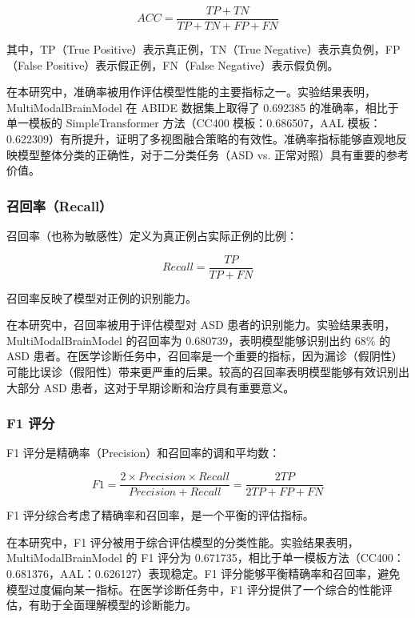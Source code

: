 \documentclass[12pt,a4paper]{article}
\begin{document}
\begin{equation}
ACC = \frac{TP + TN}{TP + TN + FP + FN}
\end{equation}

其中，TP（True Positive）表示真正例，TN（True Negative）表示真负例，FP（False Positive）表示假正例，FN（False Negative）表示假负例。

在本研究中，准确率被用作评估模型性能的主要指标之一。实验结果表明，MultiModalBrainModel 在 ABIDE 数据集上取得了 0.692385 的准确率，相比于单一模板的 SimpleTransformer 方法（CC400 模板：0.686507，AAL 模板：0.622309）有所提升，证明了多视图融合策略的有效性。准确率指标能够直观地反映模型整体分类的正确性，对于二分类任务（ASD vs. 正常对照）具有重要的参考价值。

\subsubsection{召回率（Recall）}

召回率（也称为敏感性）定义为真正例占实际正例的比例：

\begin{equation}
Recall = \frac{TP}{TP + FN}
\end{equation}

召回率反映了模型对正例的识别能力。

在本研究中，召回率被用于评估模型对 ASD 患者的识别能力。实验结果表明，MultiModalBrainModel 的召回率为 0.680739，表明模型能够识别出约 68\% 的 ASD 患者。在医学诊断任务中，召回率是一个重要的指标，因为漏诊（假阴性）可能比误诊（假阳性）带来更严重的后果。较高的召回率表明模型能够有效识别出大部分 ASD 患者，这对于早期诊断和治疗具有重要意义。

\subsubsection{F1 评分}

F1 评分是精确率（Precision）和召回率的调和平均数：

\begin{equation}
F1 = \frac{2 \times Precision \times Recall}{Precision + Recall} = \frac{2TP}{2TP + FP + FN}
\end{equation}

F1 评分综合考虑了精确率和召回率，是一个平衡的评估指标。

在本研究中，F1 评分被用于综合评估模型的分类性能。实验结果表明，MultiModalBrainModel 的 F1 评分为 0.671735，相比于单一模板方法（CC400：0.681376，AAL：0.626127）表现稳定。F1 评分能够平衡精确率和召回率，避免模型过度偏向某一指标。在医学诊断任务中，F1 评分提供了一个综合的性能评估，有助于全面理解模型的诊断能力。
\end{document}
